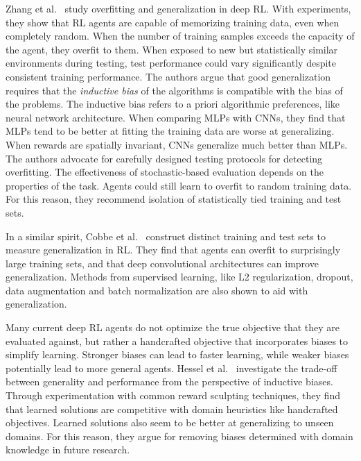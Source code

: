 Zhang et al.~\cite{zhang_overfitting_2018} study overfitting and generalization in deep RL.
With experiments, they show that RL agents are capable of memorizing training data, even when completely random.
When the number of training samples exceeds the capacity of the agent, they overfit to them.
When exposed to new but statistically similar environments during testing, test performance could vary significantly despite consistent training performance.
The authors argue that good generalization requires that the \textit{inductive bias} of the algorithms is compatible with the bias of the problems.
The inductive bias refers to a priori algorithmic preferences, like neural network architecture.
When comparing MLPs with CNNs, they find that MLPs tend to be better at fitting the training data are worse at generalizing.
When rewards are spatially invariant, CNNs generalize much better than MLPs.
The authors advocate for carefully designed testing protocols for detecting overfitting.
The effectiveness of stochastic-based evaluation depends on the properties of the task.
Agents could still learn to overfit to random training data. 
For this reason, they recommend isolation of statistically tied training and test sets.

In a similar spirit, Cobbe et al.~\cite{cobbe_generalization_2019} construct distinct training and test sets to measure generalization in RL.
They find that agents can overfit to surprisingly large training sets, and that deep convolutional architectures can improve generalization.
Methods from supervised learning, like L2 regularization, dropout, data augmentation and batch normalization are also shown to aid with generalization.

Many current deep RL agents do not optimize the true objective that they are evaluated against,
but rather a handcrafted objective that incorporates biases to simplify learning.
Stronger biases can lead to faster learning, while weaker biases potentially lead to more general agents.
Hessel et al.~\cite{hessel_inductive_2019} investigate the trade-off between generality and performance from the perspective of inductive biases.
Through experimentation with common reward sculpting techniques, they find that learned solutions are competitive with domain heuristics like handcrafted objectives.
Learned solutions also seem to be better at generalizing to unseen domains.
For this reason, they argue for removing biases determined with domain knowledge in future research.



